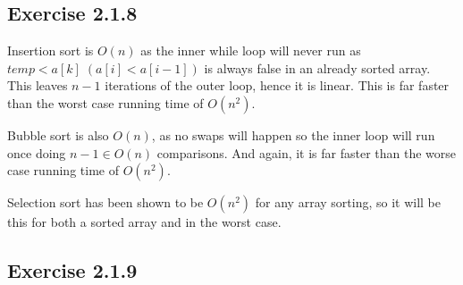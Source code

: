 \documentclass{article}
\begin{document}
\subsection*{Exercise 2.1.8}

Insertion sort is \(O(n)\) as the inner while loop will never run as \(temp < a[k]\; (a[i] < a[i-1])\) is always false in an already sorted array. This leaves \(n-1\) iterations of the outer loop, hence it is linear. This is far faster than the worst case running time of \(O(n^2)\).

Bubble sort is also \(O(n)\), as no swaps will happen so the inner loop will run once doing \(n-1 \in O(n)\) comparisons. And again, it is far faster than the worse case running time of \(O(n^2)\). 

Selection sort has been shown to be \(O(n^2)\) for any array sorting, so it will be this for both a sorted array and in the worst case.


\subsection*{Exercise 2.1.9}
\end{document}
